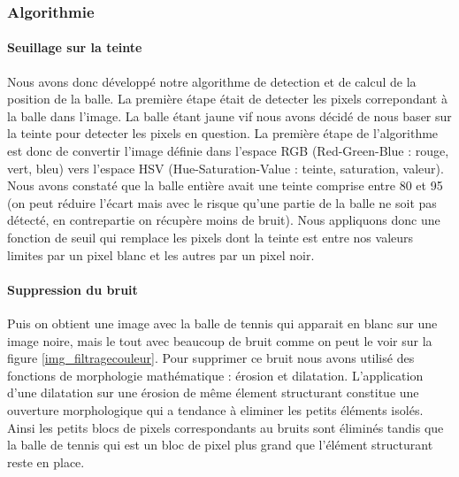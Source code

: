
\subsubsection{Algorithmie}

\paragraph{Seuillage sur la teinte\\}

Nous avons donc développé notre algorithme de detection et de calcul de la position de la balle. La première étape était de detecter les pixels correpondant à la balle dans l'image. La balle étant jaune vif nous avons décidé de nous baser sur la teinte pour detecter les pixels en question. La première étape de l'algorithme est donc de convertir l'image définie dans l'espace RGB (Red-Green-Blue : rouge, vert, bleu) vers l'espace HSV (Hue-Saturation-Value : teinte, saturation, valeur). Nous avons constaté que la balle entière avait une teinte comprise entre 80 et 95 (on peut réduire l'écart mais avec le risque qu'une partie de la balle ne soit pas détecté, en contrepartie on récupère moins de bruit). Nous appliquons donc une fonction de seuil qui remplace les pixels dont la teinte est entre nos valeurs limites par un pixel blanc et les autres par un pixel noir.\\

\paragraph{Suppression du bruit\\}

Puis on obtient une image avec la balle de tennis qui apparait en blanc sur une image noire, mais le tout avec beaucoup de bruit comme on peut le voir sur la figure \ref{img_filtragecouleur}. Pour supprimer ce bruit nous avons utilisé des fonctions de morphologie mathématique : érosion et dilatation. L'application d'une dilatation sur une érosion de même élement structurant constitue une ouverture morphologique qui a tendance à eliminer les petits éléments isolés. Ainsi les petits blocs de pixels correspondants au bruits sont éliminés tandis que la balle de tennis qui est un bloc de pixel plus grand que l'élément structurant reste en place. \\ 

